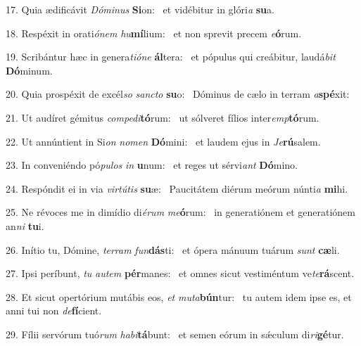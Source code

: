 17. Quia ædificávit \textit{Dó}\textit{mi}\textit{nus} \textbf{Si}on: \ast\  et vidébitur in glóri\textit{a} \textbf{su}a.\

18. Respéxit in orati\textit{ó}\textit{nem} \textit{hu}\textbf{mí}lium: \ast\  et non sprevit precem \textit{e}\textbf{ó}rum.\

19. Scribántur hæc in genera\textit{ti}\textit{ó}\textit{ne} \textbf{ál}tera: \ast\  et pópulus qui creábitur, laudá\textit{bit} \textbf{Dó}minum.\

20. Quia prospéxit de excél\textit{so} \textit{sanc}\textit{to} \textbf{su}o: \ast\  Dóminus de cælo in terram \textit{a}\textbf{spé}xit:\

21. Ut audíret gémitus \textit{com}\textit{pe}\textit{di}\textbf{tó}rum: \ast\  ut sólveret fílios inter\textit{emp}\textbf{tó}rum.\

22. Ut annúntient in Si\textit{on} \textit{no}\textit{men} \textbf{Dó}mini: \ast\  et laudem ejus in \textit{Je}\textbf{rú}salem.\

23. In conveniéndo pó\textit{pu}\textit{los} \textit{in} \textbf{u}num: \ast\  et reges ut sérvi\textit{ant} \textbf{Dó}mino.\

24. Respóndit ei in via \textit{vir}\textit{tú}\textit{tis} \textbf{su}æ: \ast\  Paucitátem diérum meórum núnti\textit{a} \textbf{mi}hi.\

25. Ne révoces me in dimídio di\textit{é}\textit{rum} \textit{me}\textbf{ó}rum: \ast\  in generatiónem et generatiónem an\textit{ni} \textbf{tu}i.\

26. Inítio tu, Dómine, \textit{ter}\textit{ram} \textit{fun}\textbf{dás}ti: \ast\  et ópera mánuum tuárum \textit{sunt} \textbf{cæ}li.\

27. Ipsi períbunt, \textit{tu} \textit{au}\textit{tem} \textbf{pér}manes: \ast\  et omnes sicut vestiméntum ve\textit{te}\textbf{rá}scent.\

28. Et sicut opertórium mutábis eos, \textit{et} \textit{mu}\textit{ta}\textbf{bún}tur: \ast\  tu autem idem ipse es, et anni tui non \textit{de}\textbf{fí}cient.\

29. Fílii servórum tuó\textit{rum} \textit{ha}\textit{bi}\textbf{tá}bunt: \ast\  et semen eórum in sǽculum di\textit{ri}\textbf{gé}tur.\

